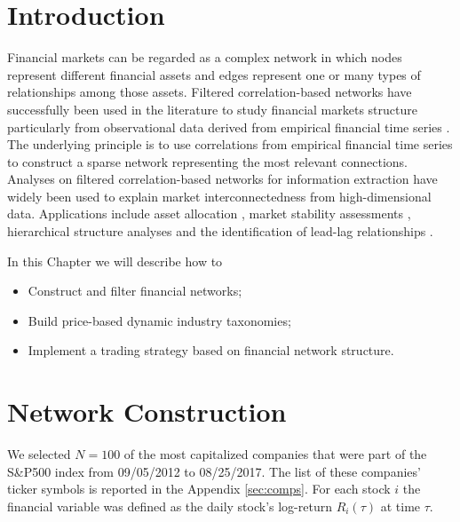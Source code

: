 \documentclass[]{book}
\providecommand{\tightlist}{%
  \setlength{\itemsep}{0pt}\setlength{\parskip}{0pt}}
\theoremstyle{definition}
\theoremstyle{definition}
\theoremstyle{definition}
\theoremstyle{remark}
\begin{document}
\section{Introduction}\label{introduction-3}

Financial markets can be regarded as a complex network in which nodes
represent different financial assets and edges represent one or many
types of relationships among those assets. Filtered correlation-based
networks have successfully been used in the literature to study
financial markets structure particularly from observational data derived
from empirical financial time series
\citep[\citet{Tumminello26072005}]{bardoscia2017pathways, 10.1371/journal.pone.0017994, Mantegna1999, aste2010correlation, Tumminello201040}.
The underlying principle is to use correlations from empirical financial
time series to construct a sparse network representing the most relevant
connections. Analyses on filtered correlation-based networks for
information extraction \citep{song2008analysis, aste2010correlation}
have widely been used to explain market interconnectedness from
high-dimensional data. Applications include asset allocation
\citep{LI2018, pozzi2013spread}, market stability assessments
\citep{morales2012dynamical}, hierarchical structure analyses
\citep{Mantegna1999, aste2010correlation, Tumminello201040, musmeci2014clustering, song2012hierarchical}
and the identification of lead-lag relationships
\citep{curme2015coupled}.

In this Chapter we will describe how to

\begin{itemize}
\tightlist
\item
  Construct and filter financial networks;
\item
  Build price-based dynamic industry taxonomies;
\item
  Implement a trading strategy based on financial network structure.
\end{itemize}

\section{Network Construction}\label{network-construction}

We selected \(N = 100\) of the most capitalized companies that were part
of the S\&P500 index from 09/05/2012 to 08/25/2017. The list of these
companies' ticker symbols is reported in the Appendix \ref{sec:comps}.
For each stock \(i\) the financial variable was defined as the daily
stock's log-return \(R_i(\tau)\) at time \(\tau\).
\end{document}
